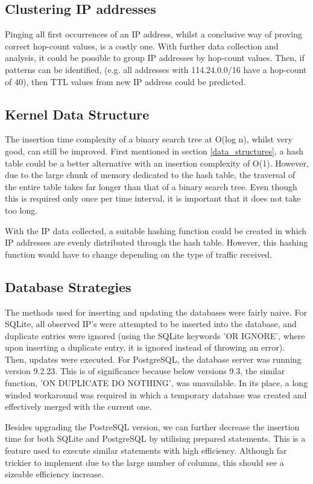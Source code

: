 \documentclass[12pt,twoside]{article}
\begin{document}
\subsection{Clustering IP addresses}
Pinging all first occurrences of an IP address, whilst a conclusive way of proving correct hop-count values, is a costly one. With further data collection and analysis, it could be possible to group IP addresses by hop-count values. Then, if patterns can be identified, (e.g. all addresses with 114.24.0.0/16 have a hop-count of 40), then TTL values from new IP address could be predicted.

\subsection{Kernel Data Structure}
The insertion time complexity of a binary search tree at O(log n), whilst very good, can still be improved. First mentioned in section \ref{data_structures}, a hash table could be a better alternative with an insertion complexity of O(1). However, due to the large chunk of memory dedicated to the hash table, the traversal of the entire table takes far longer than that of a binary search tree. Even though this is required only once per time interval, it is important that it does not take too long.

With the IP data collected, a suitable hashing function could be created in which IP addresses are evenly distributed through the hash table. However, this hashing function would have to change depending on the type of traffic received.

\subsection{Database Strategies}
The methods used for inserting and updating the databases were fairly naive. For SQLite, all observed IP's were attempted to be inserted into the database, and duplicate entries were ignored (using the SQLite keywords 'OR IGNORE', where upon inserting a duplicate entry, it is ignored instead of throwing an error). Then, updates were executed. For PostgreSQL, the database server was running version 9.2.23. This is of significance because below versions 9.3, the similar function, 'ON DUPLICATE DO NOTHING', was unavailable. In its place, a long winded workaround was required in which a temporary database was created and effectively merged with the current one.

Besides upgrading the PostreSQL version, we can further decrease the insertion time for both SQLite and PostgreSQL by utilising prepared statements. This is a feature used to execute similar statements with high efficiency. Although far trickier to implement due to the large number of columns, this should see a sizeable efficiency increase.
\end{document}
